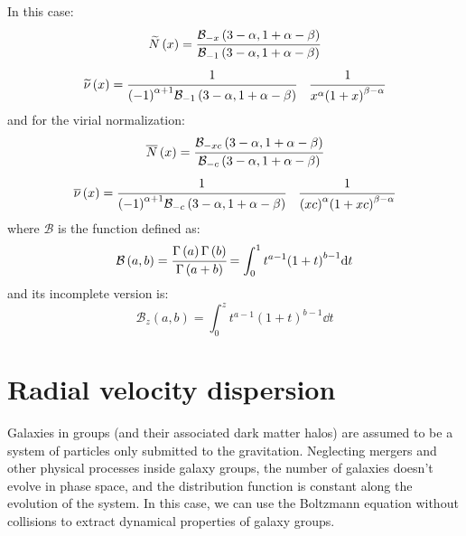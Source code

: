 In this case:
%
\begin{equation}
    \widetilde{N} \left(x\right) = \cfrac{%
        \mathcal{B}_{-x} \left(3-\alpha, 1+\alpha-\beta\right)}
    {\mathcal{B}_{-1} \left(3-\alpha, 1+\alpha-\beta\right)}
\end{equation}
%
\begin{equation}
    \widetilde\nu \left(x\right) = \cfrac{1}
    {{\left(-1\right)}^{\alpha+1}
        \mathcal{B}_{-1} \left(3-\alpha, 1+\alpha-\beta\right)}
    \quad\cfrac{1}
    {x^\alpha {\left(1+x\right)}^{\beta-\alpha}}
\end{equation}
%
and for the virial normalization:
%
\begin{equation}
    \overline{N} \left(x\right) = \cfrac{%
        \mathcal{B}_{-xc} \left(3-\alpha, 1+\alpha-\beta\right)}
    {\mathcal{B}_{-c} \left(3-\alpha, 1+\alpha-\beta\right)}
\end{equation}
%
\begin{equation}
    \overline\nu \left(x\right) = \cfrac{1}
    {{\left(-1\right)}^{\alpha+1}
        \mathcal{B}_{-c} \left(3-\alpha, 1+\alpha-\beta\right)}
    \quad\cfrac{1}
    {{\left(xc\right)}^\alpha {\left(1+xc\right)}^{\beta-\alpha}}
\end{equation}
%
where $\mathcal{B}$ is the function defined as:
%
\begin{equation}
    \mathcal{B} \left(a, b\right) =
    \cfrac{\Gamma \left(a\right) \Gamma \left(b\right)}
    {\Gamma \left(a+b\right)} =
    \int_0^1 t^{a-1} {\left(1+t\right)}^{b-1} {\rm{d}} t
\end{equation}
%
and its incomplete version is:
%
\begin{equation}
    \mathcal{B}_z \left(a, b\right) =
    \int_0^z t^{a-1} {\left(1+t\right)}^{b-1} \dd t
\end{equation}

\section{Radial velocity dispersion}
\label{sec:radial_velocity_dispersion}

Galaxies in groups (and their associated dark matter halos) are assumed to
be a system of particles only submitted to the gravitation. Neglecting
mergers and other physical processes inside galaxy groups, the number of
galaxies doesn't evolve in phase space, and the distribution function is
constant along the evolution of the system. In this case, we can use the
Boltzmann equation without collisions to extract dynamical properties of
galaxy groups.

